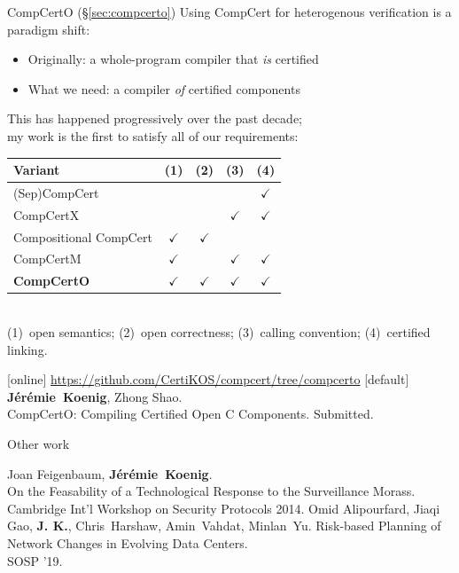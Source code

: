 \documentclass[aspectratio=141]{beamer}
\newcommand{\fme}{\textbf{J\'er\'emie~Koenig}}
\newcommand{\me}{\textbf{J. K.}}
\begin{document}
\begin{frame}{CompCertO (\S\ref{sec:compcerto})} %
  Using CompCert for heterogenous verification
  is a paradigm shift:
  \begin{itemize}
    \item Originally: a whole-program compiler that \emph{is} certified
    \item What we need: a compiler \emph{of} certified components
  \end{itemize}
  This has happened progressively over the past decade; \\
  my work is the first to satisfy all of our requirements:
  \begin{center}
    \small
    \begin{tabular}{l@{\qquad}cccc}
      \hline
      Variant & (1) & (2) & (3) & (4) \\
      \hline
      (Sep)CompCert &
        & & & $\checkmark$ \\
      CompCertX &
        & & $\checkmark$ & $\checkmark$ \\
      Compositional CompCert &
        $\checkmark$ & $\checkmark$ & & \\
      CompCertM &
        $\checkmark$ & & $\checkmark$ & $\checkmark$ \\
      \bf CompCertO &
        $\checkmark$&$\checkmark$&$\checkmark$&$\checkmark$ \\
      \hline
    \end{tabular}
    \\ \tiny
    (1)~open semantics;
    (2)~open correctness;
    (3)~calling convention;
    (4)~certified linking.
  \end{center}

  \begin{thebibliography}{10}
    [online]
      \url{https://github.com/CertiKOS/compcert/tree/compcerto}
    [default]
      \fme, Zhong Shao.
      \newblock \\
      CompCertO: Compiling Certified Open C Components.
      \newblock
      Submitted.
  \end{thebibliography}
\end{frame}

\begin{frame}{Other work} %
  \begin{thebibliography}{10}
      Joan Feigenbaum, \fme.
      \newblock \\
      On the Feasability of
      a Technological Response to the Surveillance Morass.
      \newblock \\
      Cambridge Int'l Workshop on Security Protocols 2014.
      Omid Alipourfard, Jiaqi Gao, \me,
      Chris~Harshaw, Amin~Vahdat, Minlan~Yu.
      \newblock
      Risk-based Planning of Network Changes in Evolving Data Centers.
      \newblock \\
      SOSP '19.
  \end{thebibliography}
\end{frame}
\end{document}
